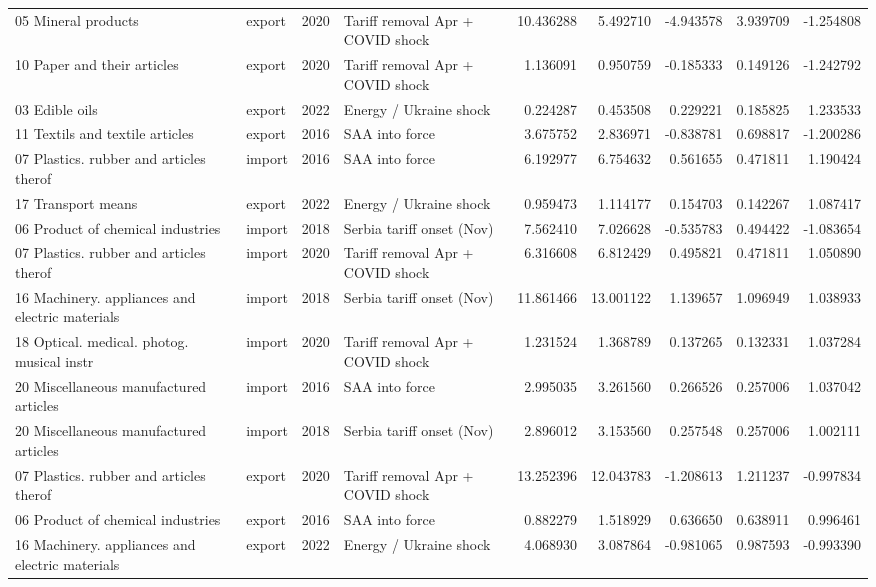 \begin{tabular}{llrlrrrrr}
05 Mineral products & export & 2020 & Tariff removal Apr + COVID shock & 10.436288 & 5.492710 & -4.943578 & 3.939709 & -1.254808 \\
10 Paper and their articles & export & 2020 & Tariff removal Apr + COVID shock & 1.136091 & 0.950759 & -0.185333 & 0.149126 & -1.242792 \\
03 Edible oils & export & 2022 & Energy / Ukraine shock & 0.224287 & 0.453508 & 0.229221 & 0.185825 & 1.233533 \\
11 Textils and textile articles & export & 2016 & SAA into force & 3.675752 & 2.836971 & -0.838781 & 0.698817 & -1.200286 \\
07 Plastics. rubber and articles therof & import & 2016 & SAA into force & 6.192977 & 6.754632 & 0.561655 & 0.471811 & 1.190424 \\
17 Transport means & export & 2022 & Energy / Ukraine shock & 0.959473 & 1.114177 & 0.154703 & 0.142267 & 1.087417 \\
06 Product of chemical industries & import & 2018 & Serbia tariff onset (Nov) & 7.562410 & 7.026628 & -0.535783 & 0.494422 & -1.083654 \\
07 Plastics. rubber and articles therof & import & 2020 & Tariff removal Apr + COVID shock & 6.316608 & 6.812429 & 0.495821 & 0.471811 & 1.050890 \\
16 Machinery. appliances and electric materials & import & 2018 & Serbia tariff onset (Nov) & 11.861466 & 13.001122 & 1.139657 & 1.096949 & 1.038933 \\
18 Optical. medical. photog. musical instr & import & 2020 & Tariff removal Apr + COVID shock & 1.231524 & 1.368789 & 0.137265 & 0.132331 & 1.037284 \\
20 Miscellaneous manufactured articles & import & 2016 & SAA into force & 2.995035 & 3.261560 & 0.266526 & 0.257006 & 1.037042 \\
20 Miscellaneous manufactured articles & import & 2018 & Serbia tariff onset (Nov) & 2.896012 & 3.153560 & 0.257548 & 0.257006 & 1.002111 \\
07 Plastics. rubber and articles therof & export & 2020 & Tariff removal Apr + COVID shock & 13.252396 & 12.043783 & -1.208613 & 1.211237 & -0.997834 \\
06 Product of chemical industries & export & 2016 & SAA into force & 0.882279 & 1.518929 & 0.636650 & 0.638911 & 0.996461 \\
16 Machinery. appliances and electric materials & export & 2022 & Energy / Ukraine shock & 4.068930 & 3.087864 & -0.981065 & 0.987593 & -0.993390 \\

\end{tabular}
